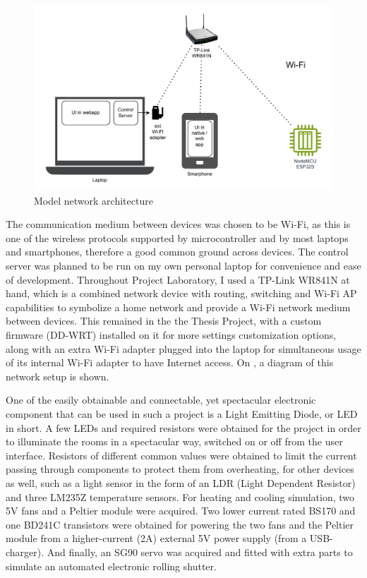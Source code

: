 \begin{figure}[!ht]
    \centering
    \includegraphics[page=1,keepaspectratio,width=150mm]{figures/box_network.drawio.pdf}
    \caption{Model network architecture}
    \label{fig:BoxNetwork}
\end{figure}

The communication medium between devices was chosen to be Wi-Fi, as this is one of the wireless protocols supported by microcontroller and by most laptops and smartphones, therefore a good common ground across devices. The control server was planned to be run on my own personal laptop for convenience and ease of development. Throughout Project Laboratory, I used a TP-Link WR841N at hand, which is a combined network device with routing, switching and Wi-Fi AP capabilities to symbolize a home network and provide a Wi-Fi network medium between devices. This remained in the the Thesis Project, with a custom firmware (DD-WRT) installed on it for more settings customization options, along with an extra Wi-Fi adapter plugged into the laptop for simultaneous usage of its internal Wi-Fi adapter to have Internet access. On , a diagram of this network setup is shown.

One of the easily obtainable and connectable, yet spectacular electronic component that can be used in such a project is a Light Emitting Diode, or LED in short. A few LEDs and required resistors were obtained for the project in order to illuminate the rooms in a spectacular way, switched on or off from the user interface. Resistors of different common values were obtained to limit the current passing through components to protect them from overheating, for other devices as well, such as a light sensor in the form of an LDR (Light Dependent Resistor) and three LM235Z temperature sensors. For heating and cooling simulation, two 5V fans and a Peltier module were acquired. Two lower current rated BS170 and one BD241C transistors were obtained for powering the two fans and the Peltier module from a higher-current (2A) external 5V power supply (from a USB-charger). And finally, an SG90 servo was acquired and fitted with extra parts to simulate an automated electronic rolling shutter.

